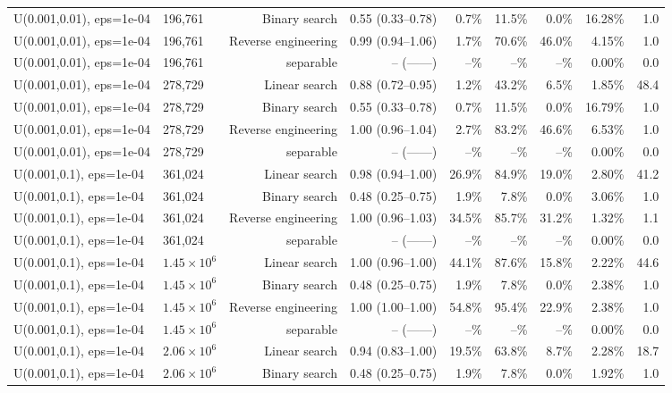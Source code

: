 \begin{tabular}{llrrrrrrr}
U(0.001,0.01), eps=1e-04 & 196,761 & Binary search & 0.55 (0.33--0.78) & 0.7\% & 11.5\% & 0.0\% & 16.28\% & 1.0 \\
U(0.001,0.01), eps=1e-04 & 196,761 & Reverse engineering & 0.99 (0.94--1.06) & 1.7\% & 70.6\% & 46.0\% & 4.15\% & 1.0 \\
U(0.001,0.01), eps=1e-04 & 196,761 & separable & -- (------) & --\% & --\% & --\% & 0.00\% & 0.0 \\
U(0.001,0.01), eps=1e-04 & 278,729 & Linear search & 0.88 (0.72--0.95) & 1.2\% & 43.2\% & 6.5\% & 1.85\% & 48.4 \\
U(0.001,0.01), eps=1e-04 & 278,729 & Binary search & 0.55 (0.33--0.78) & 0.7\% & 11.5\% & 0.0\% & 16.79\% & 1.0 \\
U(0.001,0.01), eps=1e-04 & 278,729 & Reverse engineering & 1.00 (0.96--1.04) & 2.7\% & 83.2\% & 46.6\% & 6.53\% & 1.0 \\
U(0.001,0.01), eps=1e-04 & 278,729 & separable & -- (------) & --\% & --\% & --\% & 0.00\% & 0.0 \\
U(0.001,0.1), eps=1e-04 & 361,024 & Linear search & 0.98 (0.94--1.00) & 26.9\% & 84.9\% & 19.0\% & 2.80\% & 41.2 \\
U(0.001,0.1), eps=1e-04 & 361,024 & Binary search & 0.48 (0.25--0.75) & 1.9\% & 7.8\% & 0.0\% & 3.06\% & 1.0 \\
U(0.001,0.1), eps=1e-04 & 361,024 & Reverse engineering & 1.00 (0.96--1.03) & 34.5\% & 85.7\% & 31.2\% & 1.32\% & 1.1 \\
U(0.001,0.1), eps=1e-04 & 361,024 & separable & -- (------) & --\% & --\% & --\% & 0.00\% & 0.0 \\
U(0.001,0.1), eps=1e-04 & $1.45\times 10^{6}$ & Linear search & 1.00 (0.96--1.00) & 44.1\% & 87.6\% & 15.8\% & 2.22\% & 44.6 \\
U(0.001,0.1), eps=1e-04 & $1.45\times 10^{6}$ & Binary search & 0.48 (0.25--0.75) & 1.9\% & 7.8\% & 0.0\% & 2.38\% & 1.0 \\
U(0.001,0.1), eps=1e-04 & $1.45\times 10^{6}$ & Reverse engineering & 1.00 (1.00--1.00) & 54.8\% & 95.4\% & 22.9\% & 2.38\% & 1.0 \\
U(0.001,0.1), eps=1e-04 & $1.45\times 10^{6}$ & separable & -- (------) & --\% & --\% & --\% & 0.00\% & 0.0 \\
U(0.001,0.1), eps=1e-04 & $2.06\times 10^{6}$ & Linear search & 0.94 (0.83--1.00) & 19.5\% & 63.8\% & 8.7\% & 2.28\% & 18.7 \\
U(0.001,0.1), eps=1e-04 & $2.06\times 10^{6}$ & Binary search & 0.48 (0.25--0.75) & 1.9\% & 7.8\% & 0.0\% & 1.92\% & 1.0 \\

\end{tabular}
